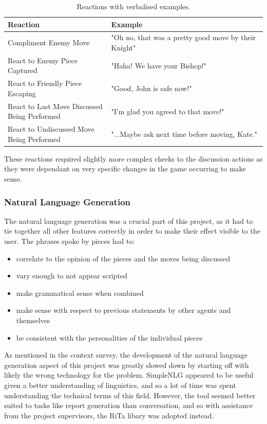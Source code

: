 \documentclass{article}
\begin{document}
\begin{table} 
\centering
\caption{Reactions with verbalised examples.} 
\label{tbl:reactions}
	\begin{tabular}{ p{0.4\linewidth}|p{0.6\linewidth} }
	Reaction & Example \\
 \hline
	Compliment Enemy Move & "Oh no, that was a pretty good move by their Knight" \\ 
	React to Enemy Piece Captured & "Haha! We have your Bishop!" \\ 
	React to Friendly Piece Escaping & "Good, John is safe now!" \\ 
	React to Last Move Discussed Being Performed & "I'm glad you agreed to that move!" \\ 
	React to Undiscussed Move Being Performed & "...Maybe ask next time before moving, Kate." \\ 
 \hline
\end{tabular}
\end{table}

These reactions required slightly more complex checks to the discussion actions as they were dependant on very specific changes in the game occurring to make sense.

\subsubsection{Natural Language Generation}

The natural language generation was a crucial part of this project, as it had to tie together all other features correctly in order to make their effect visible to the user. The phrases spoke by pieces had to:
\begin{itemize}
	\item correlate to the opinion of the pieces and the moves being discussed
	\item vary enough to not appear scripted
	\item make grammatical sense when combined 
	\item make sense with respect to previous statements by other agents and themselves
	\item be consistent with the personalities of the individual pieces
\end{itemize}

As mentioned in the context survey, the development of the natural language generation aspect of this project was greatly slowed down by starting off with likely the wrong technology for the problem. SimpleNLG appeared to be useful given a better understanding of linguistics, and so a lot of time was spent understanding the technical terms of this field. However, the tool seemed better suited to tasks like report generation than conversation, and so with assistance from the project supervisors, the RiTa libary was adopted instead.
\end{document}
